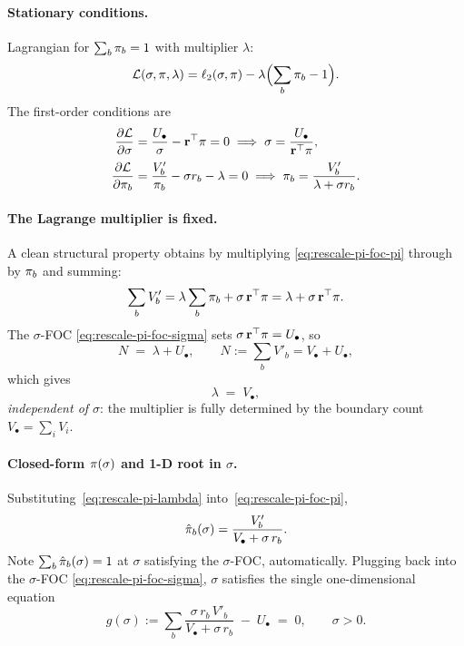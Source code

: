 \paragraph{Stationary conditions.}
Lagrangian for $\sum_b \pi_b = 1$ with multiplier $\lambda$:
\[
\mathcal{L}(\sigma,\pi,\lambda)
= \ell_2(\sigma,\pi) - \lambda\Bigl(\sum_b \pi_b - 1\Bigr).
\]
The first-order conditions are
\begin{align}
\frac{\partial \mathcal{L}}{\partial \sigma}
   &= \frac{U_\bullet}{\sigma} - \mathbf{r}^\top\pi = 0
   \;\Longrightarrow\;
   \sigma = \frac{U_\bullet}{\mathbf{r}^\top\pi},
   \label{eq:rescale-pi-foc-sigma}\\[2pt]
\frac{\partial \mathcal{L}}{\partial \pi_b}
   &= \frac{V'_b}{\pi_b} - \sigma r_b - \lambda = 0
   \;\Longrightarrow\;
   \pi_b = \frac{V'_b}{\lambda + \sigma r_b}.
   \label{eq:rescale-pi-foc-pi}
\end{align}

\paragraph{The Lagrange multiplier is fixed.}
A clean structural property obtains by multiplying
\eqref{eq:rescale-pi-foc-pi} through by $\pi_b$ and summing:
\[
\sum_b V'_b = \lambda \sum_b \pi_b + \sigma\, \mathbf{r}^\top \pi
= \lambda + \sigma\,\mathbf{r}^\top\pi.
\]
The $\sigma$-FOC \eqref{eq:rescale-pi-foc-sigma} sets
$\sigma\,\mathbf{r}^\top\pi = U_\bullet$, so
\[
N \;=\; \lambda + U_\bullet,
\qquad N := \sum_b V'_b = V_\bullet + U_\bullet,
\]
which gives
\begin{equation}\label{eq:rescale-pi-lambda}
\boxed{\;\lambda \;=\; V_\bullet,\;}
\end{equation}
\emph{independent of $\sigma$}: the multiplier is fully determined by
the boundary count $V_\bullet = \sum_i V_i$.

\paragraph{Closed-form $\pi(\sigma)$ and 1-D root in $\sigma$.}
Substituting~\eqref{eq:rescale-pi-lambda}
into~\eqref{eq:rescale-pi-foc-pi},
\begin{equation}\label{eq:rescale-pi-pi-of-sigma}
\hat{\pi}_b(\sigma) = \frac{V'_b}{V_\bullet + \sigma\, r_b}.
\end{equation}
Note $\sum_b \hat{\pi}_b(\sigma) = 1$ at $\sigma$ satisfying the
$\sigma$-FOC, automatically.  Plugging back into the
$\sigma$-FOC \eqref{eq:rescale-pi-foc-sigma}, $\sigma$ satisfies the
single one-dimensional equation
\begin{equation}\label{eq:rescale-pi-sigma-eq}
g(\sigma) := \sum_b \frac{\sigma\, r_b\, V'_b}{V_\bullet + \sigma\, r_b}
\;-\; U_\bullet \;=\; 0,
\qquad \sigma > 0.
\end{equation}

